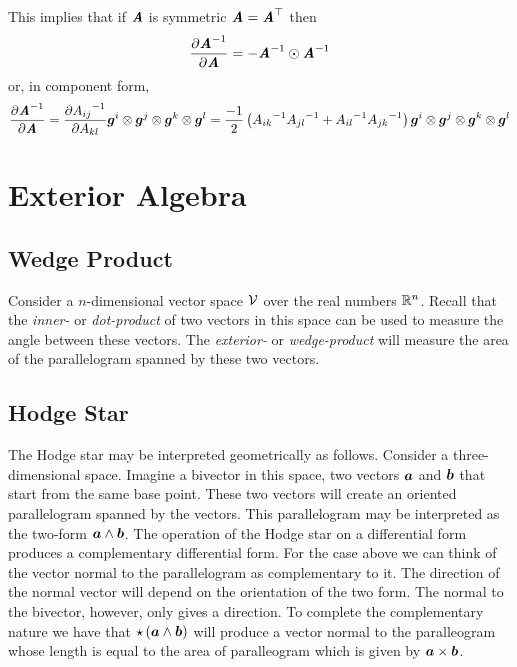 This implies that if $\boldsymbol{\mathit{A}}$ is symmetric \ie
$\boldsymbol{\mathit{A}}= {\boldsymbol{\mathit{A}}}^{ \top } $ then
\begin{equation}
  \delby{\inverse{\tensortwo{A}}}{\tensortwo{A}}=\symtensorprod{-\inverse{\tensortwo{A}}}{\inverse{\tensortwo{A}}}
  \label{eqn:DerivInverseSymmetricTensorSecondOrder}
\end{equation}
or, in component form,
\begin{equation}
   \dfrac{\partial {\ensuremath{\boldsymbol{\mathit{A}}}}^{-1}}{\partial \boldsymbol{\mathit{A}}} = \dfrac{\partial {A_{ij}}^{-1}}{\partial A_{kl}}   \boldsymbol{g} ^{i} \otimes  \boldsymbol{g} ^{j} \otimes  \boldsymbol{g} ^{k} \otimes  \boldsymbol{g} ^{l} =\dfrac{-1}{2}\left( {A_{ik}}^{-1}{A_{jl}}^{-1}+{A_{il}}^{-1}{A_{jk}}^{-1} \right)  \boldsymbol{g} ^{i} \otimes  \boldsymbol{g} ^{j} \otimes  \boldsymbol{g} ^{k} \otimes  \boldsymbol{g} ^{l} 
\end{equation}


\section{Exterior Algebra}
\label{sec:ExteriorAlgebra}

\subsection{Wedge Product}
\label{subsec:WedgeProduct}

Consider a $n$-dimensional vector space $ \mathcal{V} $ over the real
numbers $\rntopology{n}$. Recall that the \emph{inner-} or \emph{dot-product}
of two vectors in this space can be used to measure the angle between these
vectors. The \emph{exterior-} or \emph{wedge-product} will measure the area of
the parallelogram spanned by these two vectors. 

\subsection{Hodge Star}
\label{subsec:HodgeStar}

The Hodge star may be interpreted geometrically as follows. Consider a
three-dimensional space. Imagine a bivector in this space, \ie two vectors
$ \boldsymbol{a} $ and $ \boldsymbol{b} $ that start from the same base point. These two
vectors will create an oriented parallelogram spanned by the vectors. This
parallelogram may be interpreted as the two-form
$  \boldsymbol{a}  \wedge  \boldsymbol{b}  $. The operation of the Hodge star on a
differential form produces a complementary differential form. For the case
above we can think of the vector normal to the parallelogram as complementary
to it. The direction of the normal vector will depend on the orientation of
the two form. The normal to the bivector, however, only gives a direction. To
complete the complementary nature we have that
$  \star \left(   \boldsymbol{a}  \wedge  \boldsymbol{b}   \right) $ will produce a vector
normal to the paralleogram whose length is equal to the area of paralleogram
which is given by $  \boldsymbol{a}  \times  \boldsymbol{b}  $.

